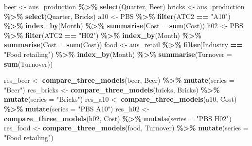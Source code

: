 \documentclass[
  11pt,
]{article}
\newenvironment{Shaded}{\begin{snugshade}}{\end{snugshade}}
\newcommand{\AttributeTok}[1]{\textcolor[rgb]{0.13,0.29,0.53}{#1}}
\newcommand{\FunctionTok}[1]{\textcolor[rgb]{0.13,0.29,0.53}{\textbf{#1}}}
\newcommand{\NormalTok}[1]{#1}
\newcommand{\OtherTok}[1]{\textcolor[rgb]{0.56,0.35,0.01}{#1}}
\newcommand{\SpecialCharTok}[1]{\textcolor[rgb]{0.81,0.36,0.00}{\textbf{#1}}}
\newcommand{\StringTok}[1]{\textcolor[rgb]{0.31,0.60,0.02}{#1}}
\begin{document}
\begin{Shaded}
\begin{Highlighting}[]
\NormalTok{beer }\OtherTok{\textless{}{-}}\NormalTok{ aus\_production }\SpecialCharTok{\%\textgreater{}\%} \FunctionTok{select}\NormalTok{(Quarter, Beer)}
\NormalTok{bricks }\OtherTok{\textless{}{-}}\NormalTok{ aus\_production }\SpecialCharTok{\%\textgreater{}\%} \FunctionTok{select}\NormalTok{(Quarter, Bricks)}
\NormalTok{a10 }\OtherTok{\textless{}{-}}\NormalTok{ PBS }\SpecialCharTok{\%\textgreater{}\%} \FunctionTok{filter}\NormalTok{(ATC2 }\SpecialCharTok{==} \StringTok{"A10"}\NormalTok{) }\SpecialCharTok{\%\textgreater{}\%} \FunctionTok{index\_by}\NormalTok{(Month) }\SpecialCharTok{\%\textgreater{}\%} \FunctionTok{summarise}\NormalTok{(}\AttributeTok{Cost =} \FunctionTok{sum}\NormalTok{(Cost))}
\NormalTok{h02 }\OtherTok{\textless{}{-}}\NormalTok{ PBS }\SpecialCharTok{\%\textgreater{}\%} \FunctionTok{filter}\NormalTok{(ATC2 }\SpecialCharTok{==} \StringTok{"H02"}\NormalTok{) }\SpecialCharTok{\%\textgreater{}\%} \FunctionTok{index\_by}\NormalTok{(Month) }\SpecialCharTok{\%\textgreater{}\%} \FunctionTok{summarise}\NormalTok{(}\AttributeTok{Cost =} \FunctionTok{sum}\NormalTok{(Cost))}
\NormalTok{food }\OtherTok{\textless{}{-}}\NormalTok{ aus\_retail }\SpecialCharTok{\%\textgreater{}\%}
  \FunctionTok{filter}\NormalTok{(Industry }\SpecialCharTok{==} \StringTok{"Food retailing"}\NormalTok{) }\SpecialCharTok{\%\textgreater{}\%}
  \FunctionTok{index\_by}\NormalTok{(Month) }\SpecialCharTok{\%\textgreater{}\%}
  \FunctionTok{summarise}\NormalTok{(}\AttributeTok{Turnover =} \FunctionTok{sum}\NormalTok{(Turnover))}

\NormalTok{res\_beer }\OtherTok{\textless{}{-}} \FunctionTok{compare\_three\_models}\NormalTok{(beer, Beer) }\SpecialCharTok{\%\textgreater{}\%} \FunctionTok{mutate}\NormalTok{(}\AttributeTok{series =} \StringTok{"Beer"}\NormalTok{)}
\NormalTok{res\_bricks }\OtherTok{\textless{}{-}} \FunctionTok{compare\_three\_models}\NormalTok{(bricks, Bricks) }\SpecialCharTok{\%\textgreater{}\%} \FunctionTok{mutate}\NormalTok{(}\AttributeTok{series =} \StringTok{"Bricks"}\NormalTok{)}
\NormalTok{res\_a10 }\OtherTok{\textless{}{-}} \FunctionTok{compare\_three\_models}\NormalTok{(a10, Cost) }\SpecialCharTok{\%\textgreater{}\%} \FunctionTok{mutate}\NormalTok{(}\AttributeTok{series =} \StringTok{"PBS A10"}\NormalTok{)}
\NormalTok{res\_h02 }\OtherTok{\textless{}{-}} \FunctionTok{compare\_three\_models}\NormalTok{(h02, Cost) }\SpecialCharTok{\%\textgreater{}\%} \FunctionTok{mutate}\NormalTok{(}\AttributeTok{series =} \StringTok{"PBS H02"}\NormalTok{)}
\NormalTok{res\_food }\OtherTok{\textless{}{-}} \FunctionTok{compare\_three\_models}\NormalTok{(food, Turnover) }\SpecialCharTok{\%\textgreater{}\%} \FunctionTok{mutate}\NormalTok{(}\AttributeTok{series =} \StringTok{"Food retailing"}\NormalTok{)}


\end{Highlighting}
\end{Shaded}
\end{document}
